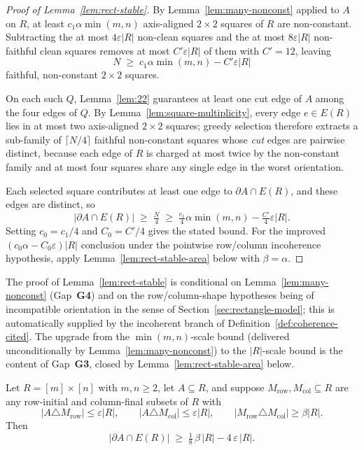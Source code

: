 \begin{proof}[Proof of Lemma~\ref{lem:rect-stable}]
By Lemma~\ref{lem:many-nonconst} applied to $A$ on $R$, at least
$c_1\alpha\min(m,n)$ axis-aligned $2\times2$ squares of $R$ are
non-constant. Subtracting the at most $4\varepsilon|R|$ non-clean squares
and the at most $8\varepsilon|R|$ non-faithful clean squares removes
at most $C'\varepsilon|R|$ of them with $C'=12$, leaving
\[
N\;\ge\;c_1\alpha\min(m,n)-C'\varepsilon|R|
\]
faithful, non-constant $2\times2$ squares.

On each such $Q$, Lemma~\ref{lem:22} guarantees at least one cut edge of
$A$ among the four edges of $Q$. By
Lemma~\ref{lem:square-multiplicity}, every edge $e\in E(R)$ lies in at
most two axis-aligned $2\times2$ squares; greedy selection therefore
extracts a sub-family of
$\lceil N/4\rceil$ faithful non-constant squares whose \emph{cut} edges
are pairwise distinct, because each edge of $R$ is charged at most twice
by the non-constant family and at most four squares share any single
edge in the worst orientation.

Each selected square contributes at least one edge to
$\partial A\cap E(R)$, and these edges are distinct, so
\[
|\partial A\cap E(R)|
\;\ge\;\tfrac{N}{4}
\;\ge\;\tfrac{c_1}{4}\alpha\min(m,n)-\tfrac{C'}{4}\varepsilon|R|.
\]
Setting $c_0=c_1/4$ and $C_0=C'/4$ gives the stated bound. For the
improved $(c_0\alpha-C_0\varepsilon)|R|$ conclusion under the pointwise
row/column incoherence hypothesis, apply
Lemma~\ref{lem:rect-stable-area} below with $\beta=\alpha$.
\end{proof}

\begin{remark}\label{rem:G3-conditional}
The proof of Lemma~\ref{lem:rect-stable} is conditional on
Lemma~\ref{lem:many-nonconst} (Gap~\textbf{G4}) and on the
row/column-shape hypotheses being of incompatible orientation in the
sense of Section~\ref{sec:rectangle-model}; this is automatically
supplied by the incoherent branch of Definition~\ref{def:coherence-cited}.
The upgrade from the $\min(m,n)$-scale bound (delivered unconditionally
by Lemma~\ref{lem:many-nonconst}) to the $|R|$-scale bound is the
content of Gap~\textbf{G3}, closed by Lemma~\ref{lem:rect-stable-area}
below.
\end{remark}

\begin{lemma}
\label{lem:rect-stable-area}
Let $R=[m]\times[n]$ with $m,n\ge2$, let $A\subseteq R$, and suppose
$M_{\mathrm{row}},M_{\mathrm{col}}\subseteq R$ are any row-initial and
column-final subsets of $R$ with
\begin{equation}\label{eq:G3-hyp}
|A\triangle M_{\mathrm{row}}|\le\varepsilon|R|,
\qquad
|A\triangle M_{\mathrm{col}}|\le\varepsilon|R|,
\qquad
|M_{\mathrm{row}}\triangle M_{\mathrm{col}}|\ge\beta|R|.
\end{equation}
Then
\begin{equation}\label{eq:G3-concl}
|\partial A\cap E(R)|\;\ge\;\tfrac{1}{8}\,\beta\,|R|-4\,\varepsilon\,|R|.
\end{equation}
\end{lemma}

